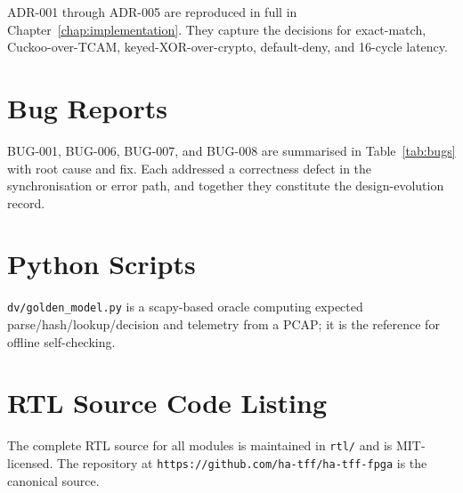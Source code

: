 \documentclass[12pt,twoside,openright]{book}
\begin{document}
ADR-001 through ADR-005 are reproduced in full in Chapter~\ref{chap:implementation}. They capture
the decisions for exact-match, Cuckoo-over-TCAM, keyed-XOR-over-crypto, default-deny, and 16-cycle
latency.

\chapter{Bug Reports}
\label{app:bugs}

BUG-001, BUG-006, BUG-007, and BUG-008 are summarised in Table~\ref{tab:bugs} with root cause and
fix. Each addressed a correctness defect in the synchronisation or error path, and together they
constitute the design-evolution record.

\chapter{Python Scripts}
\label{app:py}

\texttt{dv/golden\_model.py} is a scapy-based oracle computing expected parse/hash/lookup/decision
and telemetry from a PCAP; it is the reference for offline self-checking.

\chapter{RTL Source Code Listing}
\label{app:src}

The complete RTL source for all modules is maintained in \texttt{rtl/} and is MIT-licensed. The
repository at \texttt{https://github.com/ha-tff/ha-tff-fpga} is the canonical source.
\end{document}
